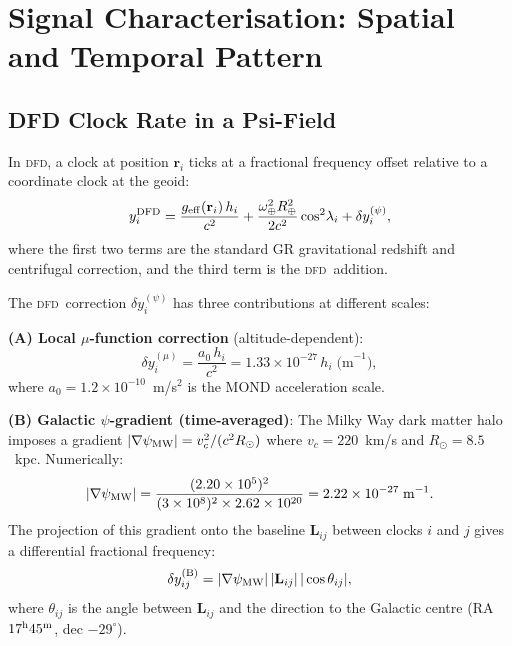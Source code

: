 \documentclass[aps,prd,twocolumn,superscriptaddress,nofootinbib]{revtex4-2}
\newcommand{\DFD}{\textsc{dfd}}
\begin{document}
\section{Signal Characterisation: Spatial and Temporal Pattern}
\label{sec:signal}

\subsection{DFD Clock Rate in a Psi-Field}
\label{subsec:rate}

In \DFD, a clock at position $\mathbf{r}_i$ ticks at a fractional frequency
offset relative to a coordinate clock at the geoid:
\begin{equation}
y_i^{\rm DFD} = \frac{g_{\rm eff}(\mathbf{r}_i)\,h_i}{c^2}
  + \frac{\omega_\oplus^2 R_\oplus^2}{2c^2}\cos^2\!\lambda_i
  + \delta y_i^{(\psi)},
\label{eq:dfd_clock_rate}
\end{equation}
where the first two terms are the standard GR gravitational redshift and
centrifugal correction, and the third term is the \DFD\ addition.

The \DFD\ correction $\delta y_i^{(\psi)}$ has three contributions at
different scales:

\textbf{(A) Local $\mu$-function correction} (altitude-dependent):
\begin{equation}
\delta y_i^{(\mu)} = \frac{a_0\,h_i}{c^2}
= 1.33\times10^{-27}\,h_i\;\text{(m}^{-1}\text{)},
\label{eq:mu_term}
\end{equation}
where $a_0 = 1.2\times10^{-10}$~m/s$^2$ is the MOND acceleration scale.

\textbf{(B) Galactic $\psi$-gradient (time-averaged)}:
The Milky Way dark matter halo imposes a gradient
$|\nabla\psi_{\rm MW}| = v_c^2/(c^2 R_\odot)$ where $v_c = 220$~km/s
and $R_\odot = 8.5$~kpc. Numerically:
\begin{equation}
|\nabla\psi_{\rm MW}| = \frac{(2.20\times10^5)^2}
  {(3\times10^8)^2 \times 2.62\times10^{20}}
= 2.22\times10^{-27}\;\text{m}^{-1}.
\label{eq:gal_gradient}
\end{equation}
The projection of this gradient onto the baseline $\mathbf{L}_{ij}$ between
clocks $i$ and $j$ gives a differential fractional frequency:
\begin{equation}
\delta y_{ij}^{(\rm B)} = |\nabla\psi_{\rm MW}|\,
  |\mathbf{L}_{ij}|\,|\cos\theta_{ij}|,
\label{eq:gal_proj}
\end{equation}
where $\theta_{ij}$ is the angle between $\mathbf{L}_{ij}$ and the direction
to the Galactic centre (RA $17^{\rm h}45^{\rm m}$, dec $-29^\circ$).
\end{document}
